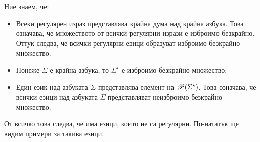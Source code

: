\begin{remark}
  Ние знаем, че:
  \begin{itemize}
  \item
    Всеки регулярен израз представлява крайна дума над крайна азбука.
    Това означава, че множеството от всички регулярни изрази е изброимо безкрайно.
    Оттук следва, че всички регулярни езици образуват изброимо безкрайно множество.
  \item 
    Понеже $\Sigma$ е крайна азбука, то $\Sigma^\star$ е изброимо безкрайно множество;
  \item
    Един език над азбуката $\Sigma$ представлява елемент на $\mathscr{P}(\Sigma^\star)$.
    Това означава, че всички езици над азбуката $\Sigma$ представляват неизброимо безкрайно множество.
  \end{itemize}
  От всичко това следва, че има езици, които не са регулярни.
  По-нататък ще видим примери за такива езици.
\end{remark}

